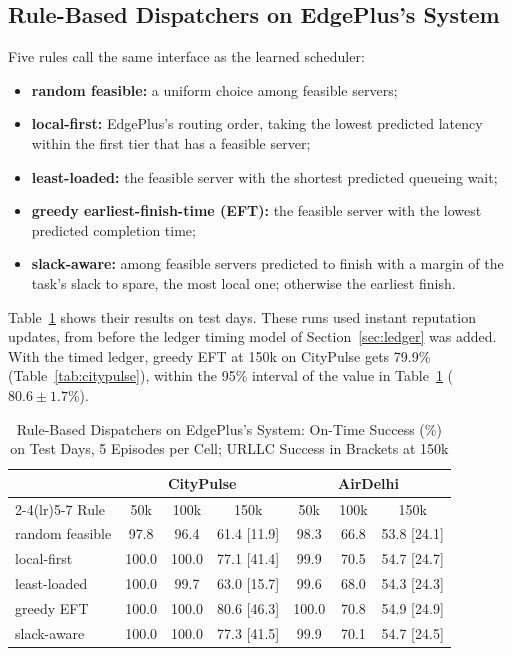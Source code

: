 \documentclass[11pt,journal,onecolumn]{IEEEtran}
\begin{document}
\subsection{Rule-Based Dispatchers on EdgePlus's System}
Five rules call the same interface as the learned scheduler:
\begin{itemize}
\item \textbf{random feasible:} a uniform choice among feasible servers;
\item \textbf{local-first:} EdgePlus's routing order, taking the lowest predicted latency within the first tier that has a feasible server;
\item \textbf{least-loaded:} the feasible server with the shortest predicted queueing wait;
\item \textbf{greedy earliest-finish-time (EFT):} the feasible server with the lowest predicted completion time;
\item \textbf{slack-aware:} among feasible servers predicted to finish with a margin of the task's slack to spare, the most local one; otherwise the earliest finish.
\end{itemize}
Table~\ref{tab:rules} shows their results on test days. These runs used instant reputation updates, from before the ledger timing model of Section~\ref{sec:ledger} was added. With the timed ledger, greedy EFT at 150k on CityPulse gets 79.9\% (Table~\ref{tab:citypulse}), within the 95\% interval of the value in Table~\ref{tab:rules} ($80.6\pm1.7$\%).

\begin{table}[!t]
\centering
\caption{Rule-Based Dispatchers on EdgePlus's System: On-Time Success (\%) on Test Days, 5 Episodes per Cell; URLLC Success in Brackets at 150k}
\label{tab:rules}
\footnotesize
\begin{tabular}{lcccccc}
\toprule
 & \multicolumn{3}{c}{CityPulse} & \multicolumn{3}{c}{AirDelhi}\\
\cmidrule(lr){2-4}\cmidrule(lr){5-7}
Rule & 50k & 100k & 150k & 50k & 100k & 150k\\
\midrule
random feasible & 97.8 & 96.4 & 61.4 [11.9] & 98.3 & 66.8 & 53.8 [24.1]\\
local-first & 100.0 & 100.0 & 77.1 [41.4] & 99.9 & 70.5 & 54.7 [24.7]\\
least-loaded & 100.0 & 99.7 & 63.0 [15.7] & 99.6 & 68.0 & 54.3 [24.3]\\
greedy EFT & 100.0 & 100.0 & 80.6 [46.3] & 100.0 & 70.8 & 54.9 [24.9]\\
slack-aware & 100.0 & 100.0 & 77.3 [41.5] & 99.9 & 70.1 & 54.7 [24.5]\\
\bottomrule
\end{tabular}
\end{table}
\end{document}
